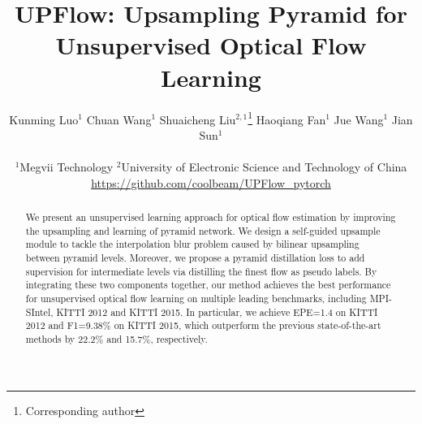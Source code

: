 \documentclass[final]{cvpr}
\begin{document}
	
\title{UPFlow: Upsampling Pyramid for Unsupervised Optical Flow Learning}
	
	\author{Kunming Luo$^1$ \quad
		Chuan Wang$^1$ \quad
		Shuaicheng Liu$^{2,1}$\thanks{Corresponding author}  \quad
		Haoqiang Fan$^1$\quad
		Jue Wang$^1$ \quad
		Jian Sun$^1$ \\\\
		$^1$Megvii Technology \quad
		$^2$University of Electronic Science and Technology of China
		\\
		\url{https://github.com/coolbeam/UPFlow_pytorch}
}
	


	\maketitle
	
	
\begin{abstract}\label{sec:abs}
		We present an unsupervised learning approach for optical flow estimation by improving the upsampling and learning of pyramid network. 
		We design a self-guided upsample module to tackle the interpolation blur problem caused by bilinear upsampling between pyramid levels. Moreover, we propose a pyramid distillation loss to add supervision for intermediate levels via distilling the finest flow as pseudo labels.
		By integrating these two components together, our method achieves the best performance for unsupervised optical flow learning on multiple leading benchmarks, including MPI-SIntel, KITTI 2012 and KITTI 2015. 
		In particular, we achieve EPE=1.4 on KITTI 2012 and F1=9.38\% on KITTI 2015, which outperform the previous state-of-the-art methods by 22.2\% and 15.7\%, respectively. 
	\end{abstract} 
\end{document}
